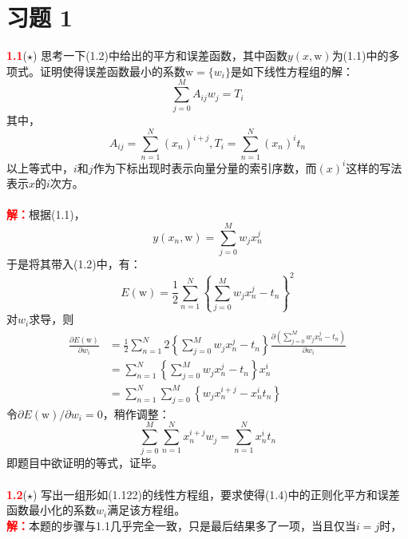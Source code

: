 \documentclass{book}
\author{张括嘉 \\ 东北大学机器人科学与工程学院}
\numberwithin{equation}{chapter}
\begin{document}
\fancyhf{}
\section*{习题 1}
	\noindent{\color{red} \rule[10pt]{\textwidth}{0.1em}}
	\textnormal{\textcolor{red}{\textbf{1.1}}\quad ($\star$) 思考一下(1.2)中给出的平方和误差函数，其中函数$y(x,\boldsymbol{\mathrm{w}})$为(1.1)中的多项式。证明使得误差函数最小的系数$\boldsymbol{\mathrm{w}}=\{w_i\}$是如下线性方程组的解：
	\begin{equation}
		\sum_{j=0}^M A_{ij}w_j = T_i
	\end{equation}
	其中，
	\begin{equation}
		A_{ij}=\sum_{n=1}^{N}(x_n)^{i+j}, T_i = \sum_{n=1}^N (x_n)^i t_n
	\end{equation}
	以上等式中，$i$和$j$作为下标出现时表示向量分量的索引序数，而$(x)^i$这样的写法表示$x$的$i$次方。\\
	\\
	\textcolor{red}{\textbf{解：}}根据(1.1)，
	\[
		y(x_n,\boldsymbol{\mathrm{w}})=\sum_{j=0}^Mw_jx_n^j
	\]
	于是将其带入(1.2)中，有：
	\[
		E(\boldsymbol{\mathrm{w}})=\frac{1}{2}\sum_{n=1}^N\left\{\sum_{j=0}^Mw_jx_n^j-t_n \right\}^2
	\]
	对$w_i$求导，则
	\[
	\begin{split}
		\frac{\partial E(\boldsymbol{\mathrm{w}})}{\partial w_i} &= \frac{1}{2} \sum_{n=1}^N 2 \left\{ \sum_{j=0}^Mw_jx_n^j-t_n \right\}\frac{\partial\left(\sum_{j=0}^Mw_jx_n^j-t_n\right)}{\partial w_i} \\
		&= \sum_{n=1}^N\left\{ \sum_{j=0}^Mw_jx_n^j-t_n\right\}x_n^i \\
		&= \sum_{n=1}^N\sum_{j=0}^M\left\{w_jx_n^{i+j}-x_n^it_n\right\}
	\end{split}
	\]
	令$\partial E(\boldsymbol{\mathrm{w}})/\partial w_i=0$，稍作调整：
	\[
		\sum_{j=0}^M \sum_{n=1}^Nx_n^{i+j}w_j=\sum_{n=1}^Nx_n^i t_n
	\]
	即题目中欲证明的等式，证毕。\\
	\\
	\textcolor{red}{\textbf{1.2}}\quad ($\star$) 写出一组形如(1.122)的线性方程组，要求使得(1.4)中的正则化平方和误差函数最小化的系数$w_i$满足该方程组。\\
	\textcolor{red}{\textbf{解：}}本题的步骤与1.1几乎完全一致，只是最后结果多了一项，当且仅当$i=j$时，
}
\end{document}
